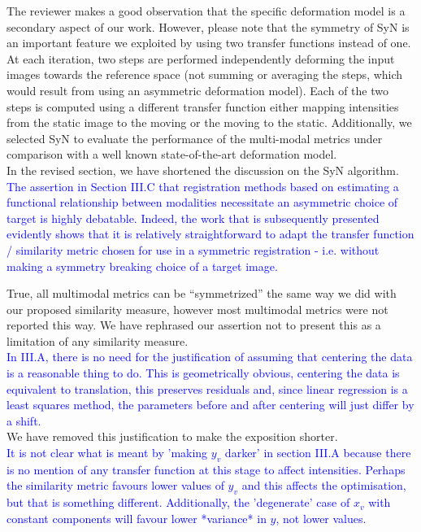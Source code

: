 \documentclass[onecolumn]{IEEEtran}
\begin{document}
The reviewer makes a good observation that the specific deformation model is a secondary aspect of our work. However, please note that the symmetry of SyN is an important feature we exploited by using two transfer functions instead of one. At each iteration, two steps are performed independently deforming the input images towards the reference space (not summing or averaging the steps, which would result from using an asymmetric deformation model). Each of the two steps is computed using a different transfer function either mapping intensities from the static image to the moving or the moving to the static. Additionally, we selected SyN to evaluate the performance of the multi-modal metrics under comparison with a well known state-of-the-art deformation model.\\

In the revised section, we have shortened the discussion on the SyN algorithm.\\

\textcolor{blue}{The assertion in Section III.C that registration methods based on estimating a functional relationship between modalities necessitate an asymmetric choice of target is highly debatable. Indeed, the work that is subsequently presented evidently shows that it is relatively straightforward to adapt the transfer function / similarity metric chosen for use in a symmetric registration - i.e. without making a symmetry breaking choice of a target image.}

True, all multimodal metrics can be “symmetrized” the same way we did with our proposed similarity measure, however most multimodal metrics were not reported this way. We have rephrased our assertion not to present this as a limitation of any similarity measure.\\

\textcolor{blue}{In III.A, there is no need for the justification of assuming that centering the data is a reasonable thing to do. This is geometrically obvious, centering the data is equivalent to translation, this preserves residuals and, since linear regression is a least squares method, the parameters before and after centering will just differ by a shift.}\\

We have removed this justification to make the exposition shorter.\\

\textcolor{blue}{It is not clear what is meant by 'making $y_v$ darker' in section III.A because there is no mention of any transfer function at this stage to affect intensities. Perhaps the similarity metric favours lower values of $y_v$ and this affects the optimisation, but that is something different. Additionally, the 'degenerate' case of $x_v$ with constant components will favour lower *variance* in $y$, not lower values.}\\
\end{document}
